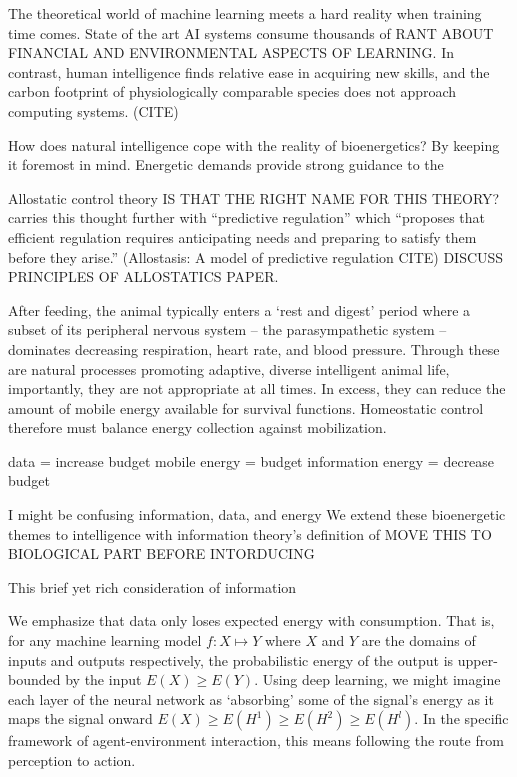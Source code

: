 \documentclass{article}
\begin{document}
The theoretical world of machine learning meets a hard reality when training time comes. State of the art AI systems consume thousands of RANT ABOUT FINANCIAL AND ENVIRONMENTAL ASPECTS OF LEARNING. In contrast, human intelligence finds relative ease in acquiring new skills, and the carbon footprint of physiologically comparable species does not approach computing systems. (CITE) 

How does natural intelligence cope with the reality of bioenergetics? By keeping it foremost in mind. Energetic demands provide strong guidance to the

Allostatic control theory IS THAT THE RIGHT NAME FOR THIS THEORY?        carries this thought further with “predictive regulation” which “proposes that efficient regulation requires anticipating needs and preparing to satisfy them before they arise.” (Allostasis: A model of predictive regulation CITE) DISCUSS PRINCIPLES OF ALLOSTATICS PAPER.

After feeding, the animal typically enters a ‘rest and digest’ period where a subset of its peripheral nervous system -- the parasympathetic system -- dominates decreasing respiration, heart rate, and blood pressure. Through these are natural processes promoting adaptive, diverse intelligent animal life, importantly, they are not appropriate at all times. In excess, they can reduce the amount of mobile energy available for survival functions. Homeostatic control therefore must balance energy collection against mobilization.
 
data = increase budget
mobile energy = budget
information energy = decrease budget

I might be confusing information, data, and energy
We extend these bioenergetic themes to intelligence with information theory’s definition of MOVE THIS TO BIOLOGICAL PART BEFORE INTORDUCING 

This brief yet rich consideration of information

We emphasize that data only loses expected energy with consumption. That is, for any machine learning model $f \colon X \mapsto Y$ where $X$ and $Y$ are the domains of inputs and outputs respectively, the probabilistic energy of the output is upper-bounded by the input $E({X}) \ge E({Y})$. Using deep learning, we might imagine each layer of the neural network as ‘absorbing’ some of the signal’s energy as it maps the signal onward $E(X) \ge E(H^1) \ge E({H}^2) \ge E(H^l)$. In the specific framework of agent-environment interaction, this means following the route from perception to action. 
\end{document}
